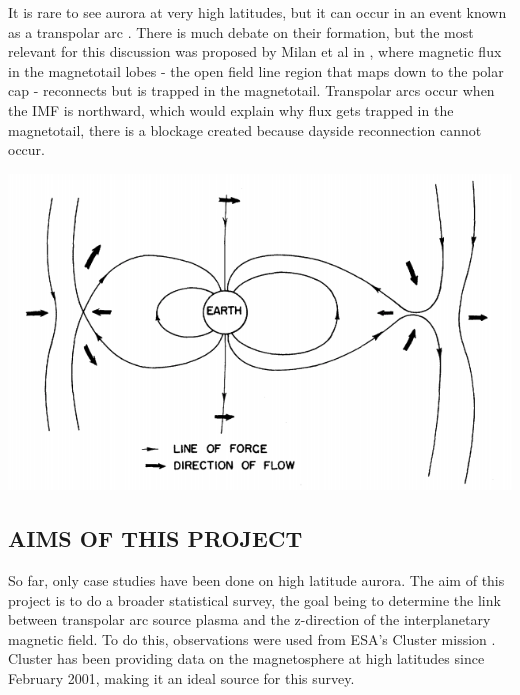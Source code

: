 \documentclass{article}
\newenvironment{Figure}
  {\par\medskip\noindent\minipage{\linewidth}}
  {\endminipage\par\medskip}
\begin{document}
\begin{multicols}{2}
It is rare to see aurora at very high latitudes, but it can occur in an event known as a transpolar arc \cite{polarAurora1, polarAurora2}. There is much debate on their formation, but the most relevant for this discussion was proposed by Milan et al in \cite{TPAdebate}, where magnetic flux in the magnetotail lobes - the open field line region that maps down to the polar cap - reconnects but is trapped in the magnetotail. Transpolar arcs occur when the IMF is northward, which would explain why flux gets trapped in the magnetotail, there is a blockage created because dayside reconnection cannot occur.

\begin{Figure}
    \centering
    \includegraphics[width=0.8\linewidth]{dungeyCycle.png}
    \label{fig:dungey}
\end{Figure}

\subsection{AIMS OF THIS PROJECT}
So far, only case studies have been done on high latitude aurora. The aim of this project is to do a broader statistical survey, the goal being to determine the link between transpolar arc source plasma and the z-direction of the interplanetary magnetic field. To do this, observations were used from ESA's Cluster mission \cite{esaCluster}. Cluster has been providing data on the magnetosphere at high latitudes since February 2001, making it an ideal source for this survey.



\end{multicols}
\end{document}
